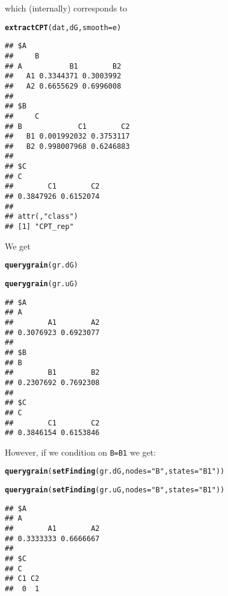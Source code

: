 \documentclass[10pt]{article}\usepackage[]{graphicx}\usepackage[]{color}
\makeatletter
\newcommand{\hlstr}[1]{\textcolor[rgb]{0.192,0.494,0.8}{#1}}%
\newcommand{\hlstd}[1]{\textcolor[rgb]{0.345,0.345,0.345}{#1}}%
\newcommand{\hlkwc}[1]{\textcolor[rgb]{0.333,0.667,0.333}{#1}}%
\newcommand{\hlkwd}[1]{\textcolor[rgb]{0.737,0.353,0.396}{\textbf{#1}}}%
\newenvironment{kframe}{%
 \def\at@end@of@kframe{}%
 \ifinner\ifhmode%
  \def\at@end@of@kframe{\end{minipage}}%
  \begin{minipage}{\columnwidth}%
 \fi\fi%
 \def\FrameCommand##1{\hskip\@totalleftmargin \hskip-\fboxsep
 \colorbox{shadecolor}{##1}\hskip-\fboxsep
     \hskip-\linewidth \hskip-\@totalleftmargin \hskip\columnwidth}%
 \MakeFramed {\advance\hsize-\width
   \@totalleftmargin\z@ \linewidth\hsize
   \@setminipage}}%
 {\par\unskip\endMakeFramed%
 \at@end@of@kframe}
\newenvironment{knitrout}{}{} %
\def\code#1{{\texttt{#1}}}
\makeatother
\begin{document}
which (internally) corresponds to
\begin{knitrout}
\color{fgcolor}\begin{kframe}
\begin{alltt}
\hlkwd{extractCPT}\hlstd{(dat, dG,} \hlkwc{smooth}\hlstd{=e)}
\end{alltt}
\begin{verbatim}
## $A
##     B
## A           B1        B2
##   A1 0.3344371 0.3003992
##   A2 0.6655629 0.6996008
## 
## $B
##     C
## B             C1        C2
##   B1 0.001992032 0.3753117
##   B2 0.998007968 0.6246883
## 
## $C
## C
##        C1        C2 
## 0.3847926 0.6152074 
## 
## attr(,"class")
## [1] "CPT_rep"
\end{verbatim}
\end{kframe}
\end{knitrout}

We get
\begin{knitrout}
\color{fgcolor}\begin{kframe}
\begin{alltt}
\hlkwd{querygrain}\hlstd{(gr.dG)}
\end{alltt}


{\ttfamily\noindent\bfseries\color{errorcolor}{\#\# Error in querygrain(gr.dG): object 'gr.dG' not found}}\begin{alltt}
\hlkwd{querygrain}\hlstd{(gr.uG)}
\end{alltt}
\begin{verbatim}
## $A
## A
##        A1        A2 
## 0.3076923 0.6923077 
## 
## $B
## B
##        B1        B2 
## 0.2307692 0.7692308 
## 
## $C
## C
##        C1        C2 
## 0.3846154 0.6153846
\end{verbatim}
\end{kframe}
\end{knitrout}

However, if we condition on \code{B=B1} we get:
\begin{knitrout}
\color{fgcolor}\begin{kframe}
\begin{alltt}
\hlkwd{querygrain}\hlstd{(}\hlkwd{setFinding}\hlstd{(gr.dG,} \hlkwc{nodes}\hlstd{=}\hlstr{"B"}\hlstd{,} \hlkwc{states}\hlstd{=}\hlstr{"B1"}\hlstd{))}
\end{alltt}


{\ttfamily\noindent\bfseries{}}\begin{alltt}
\hlkwd{querygrain}\hlstd{(}\hlkwd{setFinding}\hlstd{(gr.uG,} \hlkwc{nodes}\hlstd{=}\hlstr{"B"}\hlstd{,} \hlkwc{states}\hlstd{=}\hlstr{"B1"}\hlstd{))}
\end{alltt}
\begin{verbatim}
## $A
## A
##        A1        A2 
## 0.3333333 0.6666667 
## 
## $C
## C
## C1 C2 
##  0  1
\end{verbatim}
\end{kframe}
\end{knitrout}
\end{document}
